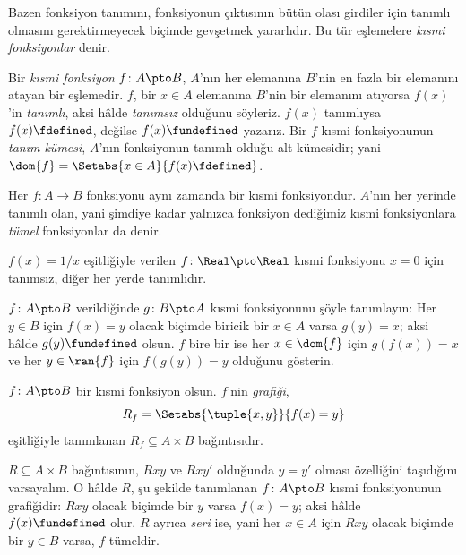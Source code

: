 \documentclass[../../../include/open-logic-section]{subfiles}
\begin{document}


\begin{explain}
Bazen fonksiyon tanımını, fonksiyonun çıktısının bütün olası girdiler için
tanımlı olmasını gerektirmeyecek biçimde gevşetmek yararlıdır. Bu tür
eşlemelere \emph{kısmi fonksiyonlar} denir.
\end{explain}

\begin{defn}
Bir \emph{kısmi fonksiyon} $f \colon A \pto B$, $A$'nın her elemanına
$B$'nin en fazla bir elemanını atayan bir eşlemedir. $f$, bir $x \in A$
elemanına $B$'nin bir elemanını atıyorsa $f(x)$'in \emph{tanımlı}, aksi
hâlde \emph{tanımsız} olduğunu söyleriz. $f(x)$ tanımlıysa
$f(x) \fdefined$, değilse $f(x) \fundefined$ yazarız. Bir $f$ kısmi
fonksiyonunun \emph{tanım kümesi}, $A$'nın fonksiyonun tanımlı olduğu alt
kümesidir; yani $\dom{f} = \Setabs{x \in A}{f(x) \fdefined}$.
\end{defn}

\begin{ex}
Her $f\colon A \to B$ fonksiyonu aynı zamanda bir kısmi fonksiyondur.
$A$'nın her yerinde tanımlı olan, yani şimdiye kadar yalnızca fonksiyon
dediğimiz kısmi fonksiyonlara \emph{tümel} fonksiyonlar da denir.
\end{ex}

\begin{ex}
$f(x)=1/x$ eşitliğiyle verilen $f \colon \Real \pto \Real$ kısmi fonksiyonu
$x=0$ için tanımsız, diğer her yerde tanımlıdır.
\end{ex}

\begin{prob}
$f\colon A \pto B$ verildiğinde $g\colon B \pto A$ kısmi fonksiyonunu şöyle
tanımlayın: Her $y \in B$ için $f(x)=y$ olacak biçimde biricik bir
$x \in A$ varsa $g(y)=x$; aksi hâlde $g(y) \fundefined$ olsun. $f$ bire bir ise
her $x \in \dom{f}$ için $g(f(x))=x$ ve her $y \in \ran{f}$ için
$f(g(y))=y$ olduğunu gösterin.
\end{prob}

\begin{defn}
$f\colon A \pto B$ bir kısmi fonksiyon olsun. $f$'nin \emph{grafiği},
\[
R_f = \Setabs{\tuple{x,y}}{f(x) = y}
\]
eşitliğiyle tanımlanan $R_f \subseteq A \times B$ bağıntısıdır.
\end{defn}

\begin{prop}
$R \subseteq A \times B$ bağıntısının, $Rxy$ ve $Rxy'$ olduğunda $y=y'$
olması özelliğini taşıdığını varsayalım. O hâlde $R$, şu şekilde tanımlanan
$f\colon A \pto B$ kısmi fonksiyonunun grafiğidir: $Rxy$ olacak biçimde bir
$y$ varsa $f(x)=y$; aksi hâlde $f(x) \fundefined$ olur. $R$ ayrıca
\emph{seri} ise, yani her $x \in A$ için $Rxy$ olacak biçimde bir $y \in B$
varsa, $f$ tümeldir.
\end{prop}
\end{document}
